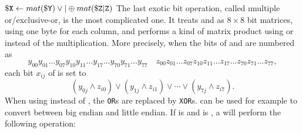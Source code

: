 \instrtbl
	{}
	{${\tt \$X} \leftarrow mat({\tt \$Y}) \lor|\oplus mat({\tt \$Z}{\tt|Z})$}
\noindent The last exotic bit operation, called \i{multiple or/exclusive-or}, is the most complicated one. It treats  and  as $8 \times 8$ bit matrices, using one byte for each column, and performs a kind of matrix product using  or  instead of the multiplication. More precisely, when the bits of  and  are numbered as
$$y_{00}y_{01}\ldots y_{07}y_{10}y_{11}\ldots y_{17}\ldots y_{70}y_{71}\ldots y_{77}\quad
z_{00}z_{01}\ldots z_{07}z_{10}z_{11}\ldots z_{17}\ldots z_{70}z_{71}\ldots z_{77},$$
each bit $x_{ij}$ of  is set to
$$(y_{0j}\land z_{i0})\lor (y_{1j}\land z_{i1})\lor \cdots \lor (y_{7j}\land z_{i7}).$$
When using  instead of , the {\tt OR}s are replaced by {\tt XOR}s.  can be used for example to convert between big endian and little endian. \citep[pg. 9]{mmix-doc} If  is  and  is , a  will perform the following operation:
